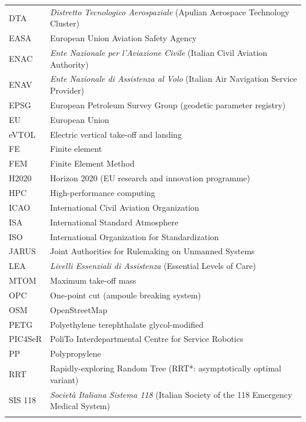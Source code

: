 {\begin{longtable}{L{0.18} L{0.82}}
DTA & \textit{Distretto Tecnologico Aerospaziale} (Apulian Aerospace Technology Cluster) \\
EASA & European Union Aviation Safety Agency \\
ENAC & \textit{Ente Nazionale per l'Aviazione Civile} (Italian Civil Aviation Authority) \\
ENAV & \textit{Ente Nazionale di Assistenza al Volo} (Italian Air Navigation Service Provider) \\
EPSG & European Petroleum Survey Group (geodetic parameter registry) \\
EU & European Union \\
eVTOL & Electric vertical take-off and landing \\
FE & Finite element \\
FEM & Finite Element Method \\
H2020 & Horizon 2020 (EU research and innovation programme) \\
HPC & High-performance computing \\
ICAO & International Civil Aviation Organization \\
ISA & International Standard Atmosphere \\
ISO & International Organization for Standardization \\
JARUS & Joint Authorities for Rulemaking on Unmanned Systems \\
LEA & \textit{Livelli Essenziali di Assistenza} (Essential Levels of Care) \\
MTOM & Maximum take-off mass \\
OPC & One-point cut (ampoule breaking system) \\
OSM & OpenStreetMap \\
PETG & Polyethylene terephthalate glycol-modified \\
PIC4SeR & PoliTo Interdepartmental Centre for Service Robotics \\
PP & Polypropylene \\
RRT & Rapidly-exploring Random Tree (RRT*: asymptotically optimal variant) \\
SIS 118 & \textit{Società Italiana Sistema 118} (Italian Society of the 118 Emergency Medical System) \\

\end{longtable}}
